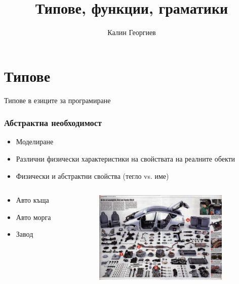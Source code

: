 \documentclass{beamer}
\begin{document}
\title[Увод в програмирането]{Типове, функции, граматики}
\author{Калин Георгиев}
\frame{\titlepage}


\section{Типове}


\begin{frame}
\centerline{Типове в езиците за програмиране}
\end{frame}



\begin{frame}[fragile]
\frametitle{Абстрактна необходимост}



\begin{itemize}
\item Моделиране
\pause
\item Различни физически характеристики на свойствата на реалните обекти
\pause
\item Физически и абстрактни свойства (тегло vs. име)

\end{itemize}

\pause


\begin{columns}[t]
  \begin{column}{0.4\textwidth}
\begin{itemize}
  \item Авто къща
  \item Авто морга
  \item Завод
\end{itemize}

  \end{column}
  \begin{column}{0.6\textwidth}

\includegraphics[width=6.4cm]{images/parts}

  \end{column}
\end{columns}



\end{frame}
\end{document}
